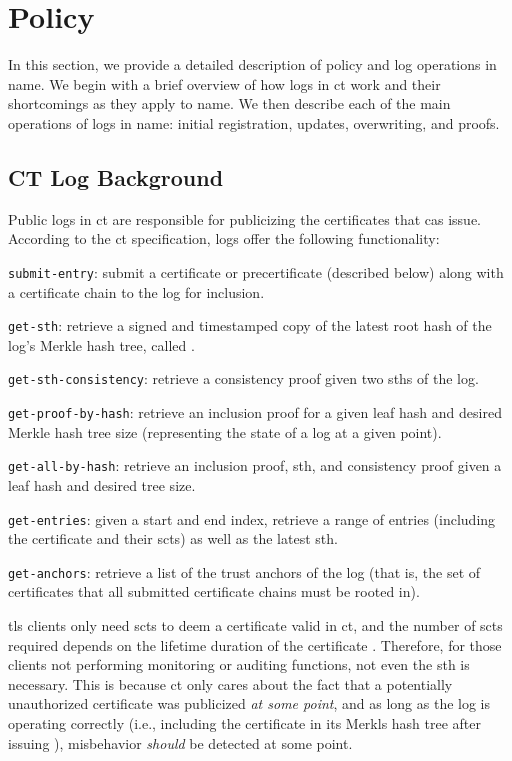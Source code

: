\section{Policy}
\label{sec:policy}

In this section, we provide a detailed description of policy and log operations
in \ac{name}. We begin with a brief overview of how logs in \ac{ct} work and
their shortcomings as they apply to \ac{name}. We then describe each of the main
operations of logs in \ac{name}: initial registration, updates, overwriting, and
proofs.

\subsection{CT Log Background}

Public logs in \ac{ct} are responsible for publicizing the certificates that
\acp{ca} issue. According to the \ac{ct} specification, logs offer the following
functionality:

\begin{compactitem}
\item \texttt{submit-entry}: submit a certificate or precertificate (described
  below) along with a certificate chain to the log for inclusion.
\item \texttt{get-sth}: retrieve a signed and timestamped copy of the
  latest root hash of the log's Merkle hash tree, called .
\item \texttt{get-sth-consistency}: retrieve a consistency proof given two
  \acp{sth} of the log.
\item \texttt{get-proof-by-hash}: retrieve an inclusion proof for a given leaf
  hash and desired Merkle hash tree size (representing the state of a log at a
  given point).
\item \texttt{get-all-by-hash}: retrieve an inclusion proof, \ac{sth}, and
  consistency proof given a leaf hash and desired tree size.
\item \texttt{get-entries}: given a start and end index, retrieve a range of
  entries (including the certificate and their \acp{sct}) as well as the latest
  \ac{sth}.
\item \texttt{get-anchors}: retrieve a list of the trust anchors of the log
  (that is, the set of certificates that all submitted certificate chains must
  be rooted in).
\end{compactitem}

\ac{tls} clients only need \acp{sct} to deem a certificate valid in \ac{ct}, and
the number of \acp{sct} required depends on the lifetime duration of the
certificate . Therefore, for those clients not
performing monitoring or auditing functions, not even the \ac{sth} is
necessary. This is because \ac{ct} only cares about the fact that a potentially
unauthorized certificate was publicized \emph{at some point}, and as long as the
log is operating correctly (i.e., including the certificate in its Merkls hash
tree after issuing ), misbehavior \emph{should} be detected at some
point.

